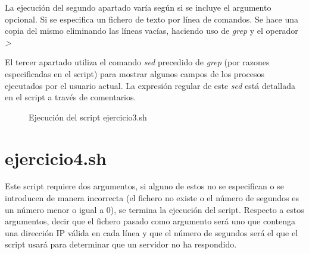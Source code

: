 \documentclass[12pt,a4paper]{article}
\begin{document}
La ejecución del segundo apartado varía según si se incluye el argumento opcional. Si se especifica un fichero de texto por línea de comandos. Se hace una copia del mismo eliminando las líneas vacías, haciendo uso de \emph{grep} y el operador \emph{\textgreater}

El tercer apartado utiliza el comando \emph{sed} precedido de \emph{grep} (por razones especificadas en el script) para mostrar algunos campos de los procesos ejecutados por el usuario actual. La expresión regular de este \emph{sed} está detallada en el script a través de comentarios.

\begin{figure}[ht]
	\centering
	\qquad
	\caption{Ejecución del script ejercicio3.sh}
\end{figure}

\newpage

\section{ejercicio4.sh}
Este script requiere dos argumentos, si alguno de estos no se especifican o se introducen de manera incorrecta (el fichero no existe o el número de segundos es un número menor o igual a 0), se termina la ejecución del script. Respecto a estos argumentos, decir que el fichero pasado como argumento será uno que contenga una dirección IP válida en cada línea y que el número de segundos será el que el script usará para determinar que un servidor no ha respondido.
\end{document}

